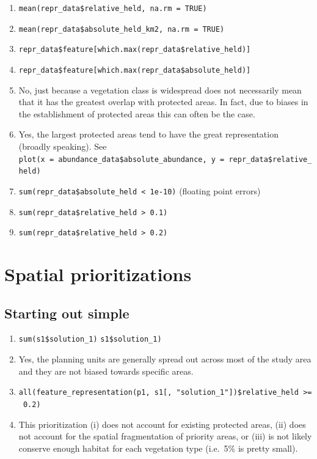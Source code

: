 \documentclass[12pt,]{book}
\providecommand{\tightlist}{%
  \setlength{\itemsep}{0pt}\setlength{\parskip}{0pt}}
\let\BeginKnitrBlock\begin \let\EndKnitrBlock\end
\begin{document}
\BeginKnitrBlock{rmdanswer}
\begin{enumerate}
\def\labelenumi{\arabic{enumi}.}
\tightlist
\item
  \texttt{mean(repr\_data\$relative\_held,\ na.rm\ =\ TRUE)}
\item
  \texttt{mean(repr\_data\$absolute\_held\_km2,\ na.rm\ =\ TRUE)}
\item
  \texttt{repr\_data\$feature{[}which.max(repr\_data\$relative\_held){]}}
\item
  \texttt{repr\_data\$feature{[}which.max(repr\_data\$absolute\_held){]}}
\item
  No, just because a vegetation class is widespread does not necessarily
  mean that it has the greatest overlap with protected areas. In fact,
  due to biases in the establishment of protected areas this can often
  be the case.
\item
  Yes, the largest protected areas tend to have the great representation
  (broadly speaking). \newline
  See
  \texttt{plot(x\ =\ abundance\_data\$absolute\_abundance,\ y\ =\ repr\_data\$relative\_held)}
\item
  \texttt{sum(repr\_data\$absolute\_held\ \textless{}\ 1e-10)} (floating
  point errors)
\item
  \texttt{sum(repr\_data\$relative\_held\ \textgreater{}\ 0.1)}
\item
  \texttt{sum(repr\_data\$relative\_held\ \textgreater{}\ 0.2)}
\end{enumerate}
\EndKnitrBlock{rmdanswer}

\section{Spatial prioritizations}\label{spatial-prioritizations}

\subsection{Starting out simple}\label{starting-out-simple-1}

\BeginKnitrBlock{rmdanswer}
\begin{enumerate}
\def\labelenumi{\arabic{enumi}.}
\tightlist
\item
  \texttt{sum(s1\$solution\_1)} \newline
   \texttt{s1\$solution\_1)}
\item
  Yes, the planning units are generally spread out across most of the
  study area and they are not biased towards specific areas.
\item
  \texttt{all(feature\_representation(p1,\ s1{[},\ "solution\_1"{]})\$relative\_held\ \textgreater{}=\ 0.2)}
\item
  This prioritization (i) does not account for existing protected areas,
  (ii) does not account for the spatial fragmentation of priority areas,
  or (iii) is not likely conserve enough habitat for each vegetation
  type (i.e.~5\% is pretty small).
\end{enumerate}
\EndKnitrBlock{rmdanswer}
\end{document}
